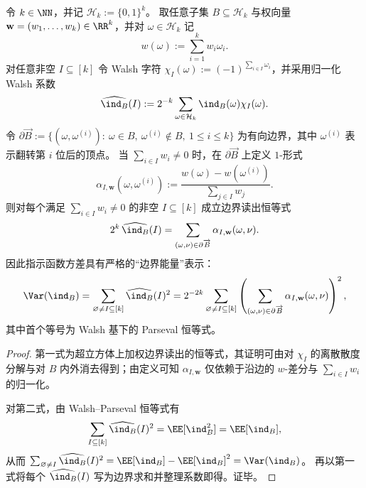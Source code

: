 
\begin{theorem}\label{thm:xi-hypercube-fourier-walsh-boundary-parseval}
令 \(k\in\NN\)，并记 \(\mathcal H_k:=\{0,1\}^k\)。
取任意子集 \(B\subseteq\mathcal H_k\) 与权向量 \(\mathbf w=(w_1,\dots,w_k)\in\RR^k\)，并对 \(\omega\in\mathcal H_k\) 记
\[
w(\omega):=\sum_{i=1}^k w_i\omega_i.
\]
对任意非空 \(I\subseteq[k]\) 令 Walsh 字符 \(\chi_I(\omega):=(-1)^{\sum_{i\in I}\omega_i}\)，并采用归一化 Walsh 系数
\[
\widehat{\ind_B}(I):=2^{-k}\sum_{\omega\in\mathcal H_k}\ind_B(\omega)\chi_I(\omega).
\]
令 \(\partial\overrightarrow{B}:=\{(\omega,\omega^{(i)}):\ \omega\in B,\ \omega^{(i)}\notin B,\ 1\le i\le k\}\) 为有向边界，其中 \(\omega^{(i)}\) 表示翻转第 \(i\) 位后的顶点。
当 \(\sum_{i\in I}w_i\neq 0\) 时，在 \(\partial\overrightarrow{B}\) 上定义 \(1\)-形式
\[
\alpha_{I,\mathbf w}(\omega,\omega^{(i)}):=\frac{w(\omega)-w(\omega^{(i)})}{\sum_{j\in I}w_j}.
\]
则对每个满足 \(\sum_{i\in I}w_i\neq 0\) 的非空 \(I\subseteq[k]\) 成立边界读出恒等式
\[
2^k\,\widehat{\ind_B}(I)=\sum_{(\omega,\nu)\in\partial\overrightarrow{B}}\alpha_{I,\mathbf w}(\omega,\nu).
\]
因此指示函数方差具有严格的“边界能量”表示：
\[
\Var(\ind_B)
=\sum_{\varnothing\neq I\subseteq[k]}\widehat{\ind_B}(I)^2
=2^{-2k}\sum_{\varnothing\neq I\subseteq[k]}
\left(\sum_{(\omega,\nu)\in\partial\overrightarrow{B}}\alpha_{I,\mathbf w}(\omega,\nu)\right)^2,
\]
其中首个等号为 Walsh 基下的 Parseval 恒等式。
\end{theorem}
\begin{proof}
第一式为超立方体上加权边界读出的恒等式，其证明可由对 \(\chi_I\) 的离散散度分解与对 \(B\) 内外消去得到；由定义可知 \(\alpha_{I,\mathbf w}\) 仅依赖于沿边的 \(w\)-差分与 \(\sum_{i\in I}w_i\) 的归一化。
\par
对第二式，由 Walsh--Parseval 恒等式有
\[
\sum_{I\subseteq[k]}\widehat{\ind_B}(I)^2=\EE[\ind_B^2]=\EE[\ind_B],
\]
从而
\(
\sum_{\varnothing\neq I}\widehat{\ind_B}(I)^2=\EE[\ind_B]-\EE[\ind_B]^2=\Var(\ind_B)
\)。
再以第一式将每个 \(\widehat{\ind_B}(I)\) 写为边界求和并整理系数即得。证毕。
\end{proof}

\endinput

